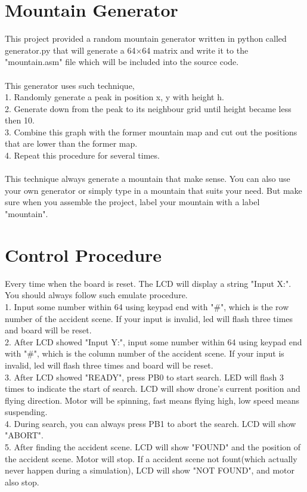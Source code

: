 \documentclass[a4paper, 12 pt]{report}
\begin{document}
\section{Mountain Generator}
This project provided a random mountain generator written in python called generator.py that will generate a 64$\times$64 matrix and write it to the "mountain.asm" file which will be included into the source code.\\\\
This generator uses such technique,\\
1. Randomly generate a peak in position x, y with height h.\\
2. Generate down from the peak to its neighbour grid until height became less then 10.\\
3. Combine this graph with the former mountain map and cut out the positions that are lower than the former map.\\
4. Repeat this procedure for several times.\\\\
This technique always generate a mountain that make sense. You can also use your own generator or simply type in a mountain that suits your need. But make sure when you assemble the project, label your mountain with a label "mountain".
\newpage
\section{Control Procedure}
Every time when the board is reset. The LCD will display a string "Input X:".\\
You should always follow such emulate procedure.\\
1. Input some number within 64 using keypad end with "\#", which is the row number of the accident scene. If your input is invalid, led will flash three times and board will be reset.\\
2. After LCD showed "Input Y:", input some number within 64 using keypad end with "\#", which is the column number of the accident scene. If your input is invalid, led will flash three times and board will be reset.\\
3. After LCD showed "READY", press PB0 to start search. LED will flash 3 times to indicate the start of search. LCD will show drone's current position and flying direction. Motor will be spinning, fast means flying high, low speed means suspending.\\
4. During search, you can always press PB1 to abort the search. LCD will show "ABORT".\\
5. After finding the accident scene. LCD will show "FOUND" and the position of the accident scene. Motor will stop. If a accident scene not fount(which actually never happen during a simulation), LCD will show "NOT FOUND", and motor also stop.
\end{document}
